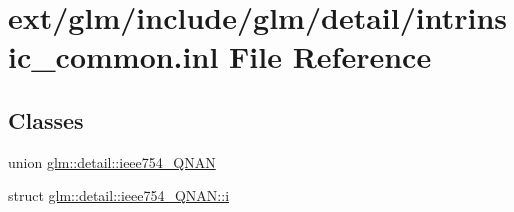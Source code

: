 \hypertarget{intrinsic__common_8inl}{\section{ext/glm/include/glm/detail/intrinsic\-\_\-common.inl File Reference}
\label{intrinsic__common_8inl}
}
\subsection*{Classes}
\begin{DoxyCompactItemize}
\item 
union \hyperlink{unionglm_1_1detail_1_1ieee754___q_n_a_n}{glm\-::detail\-::ieee754\-\_\-\-Q\-N\-A\-N}
\item 
struct \hyperlink{structglm_1_1detail_1_1ieee754___q_n_a_n_1_1i}{glm\-::detail\-::ieee754\-\_\-\-Q\-N\-A\-N\-::i}
\end{DoxyCompactItemize}
